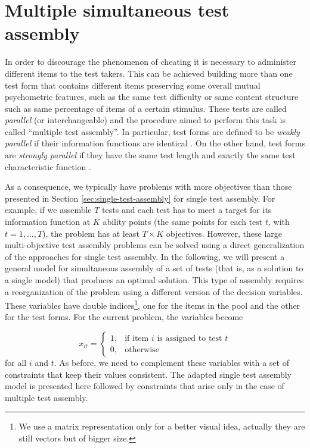 \section{Multiple simultaneous test assembly}\label{sec:multiple-test-assembly}

In order to discourage the phenomenon of cheating it is necessary to administer different items to the test takers. This can be achieved building more than one test form that contains different items preserving some overall mutual psychometric features, such as the same test difficulty or same content structure such as same percentage of items of a certain stimulus. These tests are called \emph{parallel} (or interchangeable) and the procedure aimed to perform this task is called ``multiple test assembly''. In particular, test forms are defined to be \emph{weakly parallel} if their information functions are identical \cite{Same77}. On the other hand, test forms are \emph{strongly parallel} if they have the same test length and exactly the same test characteristic function \cite{Lord80}.

As a consequence, we typically have problems with more objectives than those presented in Section \ref{sec:single-test-assembly} for single test assembly. For example, if we assemble $T$ tests and each test has to meet a target for its information function at $K$ ability points (the same points for each test $t$, with $t=1,\dots, T$), the problem has at least $T \times K$ objectives. However, these large multi-objective test assembly problems can be solved using a direct generalization of the approaches for single test assembly. In the following, we will present a general model for simultaneous assembly of a set of tests (that is, as a solution to a single model) that produces an optimal solution.
This type of assembly requires a reorganization of the problem using a different version of the decision variables. These variables have double indices\footnote{We use a matrix representation only for a better visual idea, actually they are still vectors but of bigger size.}, one for the items in the pool and the other for the test forms. For the current problem, the variables become

\begin{equation*}\label{eq:MDV}
x_{it} =
\begin{cases}
1, & \mbox{if item } i \mbox{ is assigned to test }t\\


0, & \mbox{otherwise}
\end{cases}
\end{equation*}
for all $i$ and $t$. As before, we need to complement these variables with a set of constraints that keep their values consistent. The adapted single test assembly model is presented here followed by constraints that arise only in the case of multiple test assembly.

